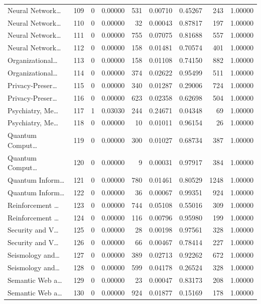\begin{table}
\begin{tabular}{lrrrrrrrr}
Neural Network… & 109 & 0 & 0.00000 & 531 & 0.00710 & 0.45267 & 243 & 1.00000 \\
Neural Network… & 110 & 0 & 0.00000 & 32 & 0.00043 & 0.87817 & 197 & 1.00000 \\
Neural Network… & 111 & 0 & 0.00000 & 755 & 0.07075 & 0.81688 & 557 & 1.00000 \\
Neural Network… & 112 & 0 & 0.00000 & 158 & 0.01481 & 0.70574 & 401 & 1.00000 \\
Organizational… & 113 & 0 & 0.00000 & 158 & 0.01108 & 0.74150 & 882 & 1.00000 \\
Organizational… & 114 & 0 & 0.00000 & 374 & 0.02622 & 0.95499 & 511 & 1.00000 \\
Privacy-Preser… & 115 & 0 & 0.00000 & 340 & 0.01287 & 0.29006 & 724 & 1.00000 \\
Privacy-Preser… & 116 & 0 & 0.00000 & 623 & 0.02358 & 0.62698 & 504 & 1.00000 \\
Psychiatry, Me… & 117 & 1 & 0.03030 & 244 & 0.24671 & 0.04348 & 69 & 1.00000 \\
Psychiatry, Me… & 118 & 0 & 0.00000 & 10 & 0.01011 & 0.96154 & 26 & 1.00000 \\
Quantum Comput… & 119 & 0 & 0.00000 & 300 & 0.01027 & 0.68734 & 387 & 1.00000 \\
Quantum Comput… & 120 & 0 & 0.00000 & 9 & 0.00031 & 0.97917 & 384 & 1.00000 \\
Quantum Inform… & 121 & 0 & 0.00000 & 780 & 0.01461 & 0.80529 & 1248 & 1.00000 \\
Quantum Inform… & 122 & 0 & 0.00000 & 36 & 0.00067 & 0.99351 & 924 & 1.00000 \\
Reinforcement … & 123 & 0 & 0.00000 & 744 & 0.05108 & 0.55016 & 309 & 1.00000 \\
Reinforcement … & 124 & 0 & 0.00000 & 116 & 0.00796 & 0.95980 & 199 & 1.00000 \\
Security and V… & 125 & 0 & 0.00000 & 28 & 0.00198 & 0.97561 & 328 & 1.00000 \\
Security and V… & 126 & 0 & 0.00000 & 66 & 0.00467 & 0.78414 & 227 & 1.00000 \\
Seismology and… & 127 & 0 & 0.00000 & 389 & 0.02713 & 0.92262 & 672 & 1.00000 \\
Seismology and… & 128 & 0 & 0.00000 & 599 & 0.04178 & 0.26524 & 328 & 1.00000 \\
Semantic Web a… & 129 & 0 & 0.00000 & 23 & 0.00047 & 0.83173 & 208 & 1.00000 \\
Semantic Web a… & 130 & 0 & 0.00000 & 924 & 0.01877 & 0.15169 & 178 & 1.00000 \\

\end{tabular}
\end{table}
